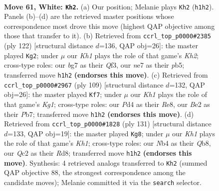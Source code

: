 \documentclass[11pt]{article}
\begin{document}
\clearpage

\begin{figure}[p]\centering
\begin{subfigure}{0.46\textwidth}\centering
\resizebox{\linewidth}{!}{%
\newchessgame
\chessboard[
  setfen={rn1qk1r1/4n1b1/6p1/3p2P1/1N1P1P1p/1R5P/1BQ1BR2/7K w - - 11 61},
  showmover=false,
  pgfstyle=straightmove, color=movearrow, markmove={h1-h2}
]}
\caption{}
\end{subfigure}\hfill
\begin{subfigure}{0.46\textwidth}\centering
\resizebox{\linewidth}{!}{%
\newchessgame
\chessboard[
  setfen={q4k2/r3n2p/1bp3pP/1p2PpP1/1P1PB3/1R3Q2/5B1K/8 w - - 4 62},
  showmover=false,
  pgfstyle=straightmove, color=movearrow, markmove={h2-g2}
]}
\caption{}
\end{subfigure}
\\[4pt]
\begin{subfigure}{0.46\textwidth}\centering
\resizebox{\linewidth}{!}{%
\newchessgame
\chessboard[
  setfen={1b2r1k1/1p1q4/2b2p2/5Pp1/p2B2P1/P1P1R3/1P2NQ2/5K2 b - - 2 55},
  showmover=false,
  pgfstyle=straightmove, color=movearrow, markmove={g8-f7}
]}
\caption{}
\end{subfigure}\hfill
\begin{subfigure}{0.46\textwidth}\centering
\resizebox{\linewidth}{!}{%
\newchessgame
\chessboard[
  setfen={1q1r3k/1b2r1p1/p3p1Bp/P1P1Np1P/1p6/1P4P1/4R1PK/5Q2 b - - 0 66},
  showmover=false,
  pgfstyle=straightmove, color=movearrow, markmove={h8-g8}
]}
\caption{}
\end{subfigure}
\caption{\textbf{Move 61, White: \texttt{Kh2}.} (a) Our position; Melanie plays \texttt{Kh2} (\texttt{h1h2}). Panels (b)--(d) are the retrieved master positions whose correspondence most drove this move (highest QAP objective among those that transfer to it). (b) Retrieved from \texttt{ccrl\_top\_p0000\#2385} (ply 122) [structural distance $d$=136, QAP obj=26]: the master played \texttt{Kg2}; under $\mu$ our \emph{Kh1} plays the role of that game's \emph{Kh2}; cross-type roles: our \emph{b}g7 as their \emph{Q}f3, our \emph{n}e7 as their \emph{p}b5; transferred move \texttt{h1h2} \textbf{(endorses this move)}. (c) Retrieved from \texttt{ccrl\_top\_p0000\#2967} (ply 109) [structural distance $d$=132, QAP obj=26]: the master played \texttt{Kf7}; under $\mu$ our \emph{Kh1} plays the role of that game's \emph{Kg1}; cross-type roles: our \emph{P}d4 as their \emph{R}e8, our \emph{B}e2 as their \emph{P}b7; transferred move \texttt{h1h2} \textbf{(endorses this move)}. (d) Retrieved from \texttt{ccrl\_top\_p0000\#1828} (ply 131) [structural distance $d$=133, QAP obj=19]: the master played \texttt{Kg8}; under $\mu$ our \emph{Kh1} plays the role of that game's \emph{Kh1}; cross-type roles: our \emph{N}b4 as their \emph{Q}b8, our \emph{Q}c2 as their \emph{R}d8; transferred move \texttt{h1h2} \textbf{(endorses this move)}. Synthesis: 4 retrieved analogs transferred to \texttt{Kh2} (summed QAP objective 88, the strongest correspondence among the candidate moves); Melanie committed it via the \texttt{search} selector.}
\label{fig:thought-m120}
\end{figure}
\end{document}
